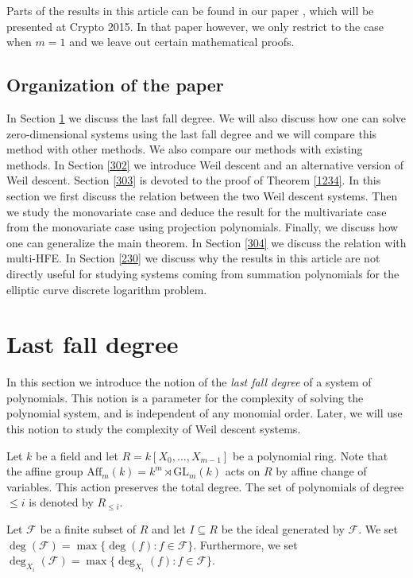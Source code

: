 \documentclass{amsart}
\theoremstyle{plain}
\theoremstyle{definition}
\begin{document}
Parts of the results in this article can be found in our paper \cite{HUA}, which will be presented at Crypto 2015. In that paper however, we only restrict to the case when $m=1$ and we leave out certain mathematical proofs.

\subsection{Organization of the paper}
In Section \ref{301} we discuss the last fall degree. We will also discuss how one can solve zero-dimensional systems using the last fall degree and we will compare this method with other methods. We also compare our methods with existing methods.
In Section \ref{302} we introduce Weil descent and an alternative version of Weil descent.
Section \ref{303} is devoted to the proof of Theorem \ref{1234}. In this section we first discuss the relation between the two Weil descent systems. Then we study the monovariate case and deduce the result for the multivariate case from the monovariate case using projection polynomials. Finally, we discuss how one can generalize the main theorem. 
In Section \ref{304} we discuss the relation with multi-HFE. In Section \ref{230} we discuss why the results in this article are not directly useful for studying systems coming from summation polynomials for the elliptic curve discrete logarithm problem.

\section{Last fall degree} \label{301}

In this section we introduce the notion of the \emph{last fall degree} of a system of polynomials. This notion is a parameter for the complexity of solving the polynomial system, and is independent of any monomial order. Later, we will use this notion to study the complexity of Weil descent systems.

Let $k$ be a field and let $R=k[X_0,\ldots,X_{m-1}]$ be a polynomial ring. Note that the affine group $\mathrm{Aff}_m(k) = k^m \rtimes \mathrm{GL}_m(k)$ acts on $R$ by affine change of variables. This action preserves the total degree. The set of polynomials of degree $\leq i$ is denoted by $R_{\leq i}$.

Let $\mathcal{F}$ be a finite subset of $R$ and let $I \subseteq R$ be the ideal generated by $\mathcal{F}$. We set $\deg(\mathcal{F})=\max \{\deg(f): f \in \mathcal{F}\}$. Furthermore, we set $\deg_{X_i}(\mathcal{F})=\max\{ \deg_{X_i}(f): f \in \mathcal{F}\}$. 
\end{document}
